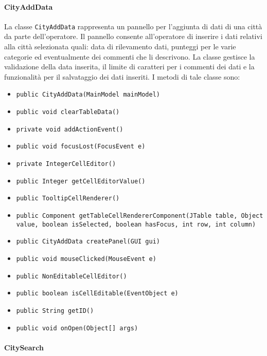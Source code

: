 \paragraph{CityAddData}

La classe \texttt{CityAddData} rappresenta un pannello per l'aggiunta di dati di una città da parte dell'operatore.
Il pannello consente all'operatore di inserire i dati relativi alla città selezionata quali: data di rilevamento dati, punteggi per le varie categorie ed eventualmente dei commenti che li descrivono.
La classe gestisce la validazione della data inserita, il limite di caratteri per i commenti dei dati e la funzionalità per il salvataggio dei dati inseriti. 
I metodi di tale classe sono:
\begin{itemize}
    \item \texttt{public CityAddData(MainModel mainModel)}
    \item \texttt{public void clearTableData()}
    \item \texttt{private void addActionEvent()}
    \item \texttt{public void focusLost(FocusEvent e)}
    \item \texttt{private IntegerCellEditor()}
    \item \texttt{public Integer getCellEditorValue()}
    \item \texttt{public TooltipCellRenderer()}
    \item \texttt{public Component getTableCellRendererComponent(JTable table, Object value, boolean isSelected, boolean hasFocus, int row, int column)}
    \item \texttt{public CityAddData createPanel(GUI gui)}
    \item \texttt{public void mouseClicked(MouseEvent e)}
    \item \texttt{public NonEditableCellEditor()}
    \item \texttt{public boolean isCellEditable(EventObject e)}
    \item \texttt{public String getID()}
    \item \texttt{public void onOpen(Object[] args)}
\end{itemize}

\paragraph{CitySearch}

